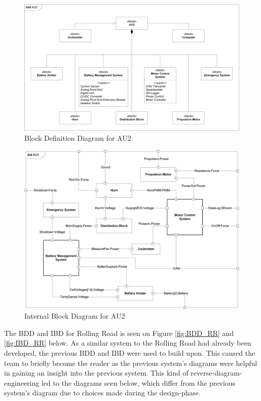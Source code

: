 \newpage
\begin{figure}[H]
	\centering
	\includegraphics[width=1\linewidth]{Architecture/BDD_AU2}
	\caption{Block Definition Diagram for AU2}
	\label{fig:BDD_AU2}
\end{figure}

\begin{figure}[H]
	\centering
	\includegraphics[width=1\linewidth]{Architecture/IBD_AU2}
	\caption{Internal Block Diagram for AU2}
	\label{fig:IBD_AU2}
\end{figure}
\newpage
The BDD and IBD for Rolling Road is seen on Figure \ref{fig:BDD_RR} and \ref{fig:IBD_RR} below. As a similar system to the Rolling Road had already been developed, the previous BDD and IBD were used to build upon. This caused the team to briefly become the reader as the previous system's diagrams were helpful in gaining an insight into the previous system. This kind of reverse-diagram-engineering led to the diagrams seen below, which differ from the previous system's diagram due to choices made during the design-phase.

